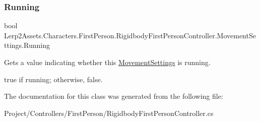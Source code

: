 \subsubsection{\texorpdfstring{Running}{Running}}
{\footnotesize\ttfamily bool Lerp2\+Assets.\+Characters.\+First\+Person.\+Rigidbody\+First\+Person\+Controller.\+Movement\+Settings.\+Running\hspace{0.3cm}{\ttfamily [get]}}



Gets a value indicating whether this \hyperlink{class_lerp2_assets_1_1_characters_1_1_first_person_1_1_rigidbody_first_person_controller_1_1_movement_settings}{Movement\+Settings} is running. 

{\ttfamily true} if running; otherwise, {\ttfamily false}.

The documentation for this class was generated from the following file\+:\begin{DoxyCompactItemize}
\item 
Project/\+Controllers/\+First\+Person/Rigidbody\+First\+Person\+Controller.\+cs\end{DoxyCompactItemize}
